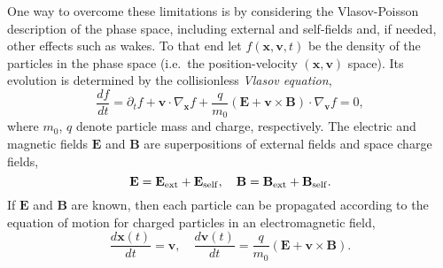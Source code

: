 One way to overcome these limitations is by considering the
Vlasov-Poisson description of the phase space, including external and
self-fields and, if needed, other effects such as wakes.  To that end
let $f(\mathbf{x},\mathbf{v},t)$ be the density of the particles in the
phase space (i.e.\ the position-velocity $(\mathbf{x}, \mathbf{v})$
space).  Its evolution is determined by the collisionless \emph{Vlasov
  equation},
\begin{equation}\label{eq:Vlasov}
  \frac{df}{dt}=\partial_t f + \mathbf{v} \cdot \nabla_{\mathbf{x}} f
  +\frac{q}{m_0}(\mathbf{E}+ \mathbf{v}\times\mathbf{B})\cdot
  \nabla_{\mathbf{v}} f  =  0,
\end{equation}
where $m_0$, $q$ denote particle mass and charge, respectively.  The
electric and magnetic fields $\mathbf{E}$ and $\mathbf{B}$ are
superpositions of external fields and space charge fields,
\begin{equation}\label{eq:allfield}
    \mathbf{E} =
    \mathbf{E_{\RM{ext}}} + \mathbf{E_{\RM{self}}}, \quad
    \mathbf{B} =
    \mathbf{B_{\RM{ext}}} + \mathbf{B_{\RM{self}}}.
\end{equation}
If $\mathbf{E}$ and $\mathbf{B}$ are known, then each particle can be
propagated according to the equation of motion for charged particles in an
electromagnetic field,
\begin{equation*}\label{eq:motion}
  \frac{d\mathbf{x}(t)}{dt}  = \mathbf{v},
  \quad
  \frac{d\mathbf{v}(t)}{dt}  = \frac{q}{m_0}\left(\mathbf{E} +
    \mathbf{v}\times \mathbf{B}\right).
\end{equation*}

